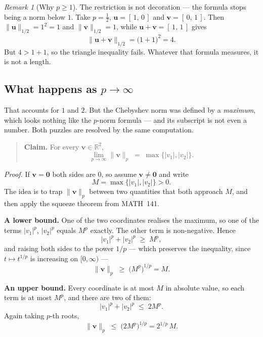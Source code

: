 \documentclass[11pt]{article}
\theoremstyle{definition}
\theoremstyle{remark}
\newtheorem*{rmk}{Remark}
\newcommand{\R}{\mathbb{R}}
\newcommand{\vc}[1]{\mathbf{#1}}
\newcommand{\norm}[1]{\lVert #1\rVert}
\begin{document}
\begin{rmk}[Why $p\ge 1$]
The restriction is not decoration --- the formula stops being a norm below $1$.
Take $p=\tfrac12$, $\vc{u}=[\,1,\,0\,]$ and $\vc{v}=[\,0,\,1\,]$. Then
$\norm{\vc{u}}_{1/2}=1^{2}=1$ and $\norm{\vc{v}}_{1/2}=1$, while
$\vc{u}+\vc{v}=[\,1,\,1\,]$ gives
\[
  \norm{\vc{u}+\vc{v}}_{1/2} = \bigl(1+1\bigr)^{2} = 4 .
\]
But $4>1+1$, so the triangle inequality fails. Whatever that formula measures,
it is not a length.
\end{rmk}

\subsection{What happens as \texorpdfstring{$p\to\infty$}{p to infinity}}
That accounts for $1$ and $2$. But the Chebyshev norm was defined by a
\emph{maximum}, which looks nothing like the $p$-norm formula --- and its
subscript is not even a number. Both puzzles are resolved by the same
computation.

\begin{quote}
\textbf{Claim.} For every $\vc{v}\in\R^{2}$,
\[
  \lim_{p\to\infty}\norm{\vc{v}}_p
  \;=\;
  \max\bigl\{\lvert v_1\rvert,\lvert v_2\rvert\bigr\} .
\]
\end{quote}

\noindent\emph{Proof.} If $\vc{v}=\vc{0}$ both sides are $0$, so assume
$\vc{v}\neq\vc{0}$ and write
\[
  M = \max\bigl\{\lvert v_1\rvert,\lvert v_2\rvert\bigr\} > 0 .
\]
The idea is to trap $\norm{\vc{v}}_p$ between two quantities that both approach
$M$, and then apply the squeeze theorem from MATH~141.

\smallskip
\noindent\textbf{A lower bound.} One of the two coordinates realises the
maximum, so one of the terms $\lvert v_1\rvert^{p}$, $\lvert v_2\rvert^{p}$
equals $M^{p}$ exactly. The other term is non-negative. Hence
\[
  \lvert v_1\rvert^{p}+\lvert v_2\rvert^{p} \;\ge\; M^{p},
\]
and raising both sides to the power $1/p$ --- which preserves the inequality,
since $t\mapsto t^{1/p}$ is increasing on $[0,\infty)$ ---
\[
  \norm{\vc{v}}_p \;\ge\; \bigl(M^{p}\bigr)^{1/p} = M .
\]

\smallskip
\noindent\textbf{An upper bound.} Every coordinate is at most $M$ in absolute
value, so each term is at most $M^{p}$, and there are two of them:
\[
  \lvert v_1\rvert^{p}+\lvert v_2\rvert^{p} \;\le\; 2M^{p} .
\]
Again taking $p$-th roots,
\[
  \norm{\vc{v}}_p \;\le\; \bigl(2M^{p}\bigr)^{1/p} = 2^{1/p}\,M .
\]
\end{document}
